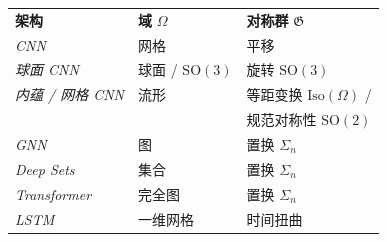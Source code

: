 \begin{tcolorbox}[width=\linewidth,
                  boxsep=0pt,
                  left=7.5pt,
                  right=7.5pt,
                  top=7.5pt,
                  bottom=7.5pt,
                  arc=0pt,
                  boxrule=0pt,toprule=0pt,
                  colback=boxgray,
                  ]%
    
\begin{center}
\begin{tabular}{lll}
     {\bf 架构} & {\bf 域} $\Omega$ & {\bf 对称群} $\mathfrak{G}$\vspace{2.5mm}\\
     {\em CNN} & 网格 & 平移\vspace{2mm}\\
%
     {\em 球面 CNN} & 球面 / $\mathrm{SO}({3})$ & 旋转 $\mathrm{SO}({3})$\vspace{2mm}\\

     {\em 内蕴 / 网格 CNN} & 流形 & 等距变换 $\mathrm{Iso}(\Omega)$ / \\
     & & 规范对称性 $\mathrm{SO}(2)$\vspace{2mm}\\


     {\em GNN} & 图 & 置换 $\Sigma_n$\vspace{2mm}\\

     {\em Deep Sets} & 集合 & 置换 $\Sigma_n$\vspace{2mm}\\
     {\em Transformer} & 完全图 & 置换 $\Sigma_n$\vspace{2mm}\\
     {\em LSTM} & 一维网格 & 时间扭曲\\


\end{tabular}
\end{center}
\end{tcolorbox}
%

